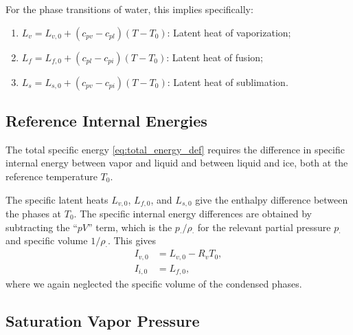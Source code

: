\documentclass{article}
\begin{document}
For the phase transitions of water, this implies specifically:
\begin{enumerate}
    \item $L_v = L_{v,0} + (c_{pv} - c_{pl}) (T - T_0)$: Latent heat of vaporization;
    \item $L_f = L_{f,0} + (c_{pl} - c_{pi}) (T - T_0)$: Latent heat of fusion;
    \item $L_s = L_{s,0} + (c_{pv} - c_{pi}) (T - T_0)$: Latent heat of sublimation.
\end{enumerate}

\subsection{Reference Internal Energies}

The total specific energy \eqref{eq:total_energy_def} requires the difference in specific internal energy between vapor and liquid and between liquid and ice, both at the reference temperature $T_0$. 

The specific latent heats $L_{v,0}$, $L_{f,0}$, and $L_{s,0}$ give the enthalpy difference between the phases at $T_0$. The specific internal energy differences are obtained by subtracting the ``$pV$'' term, which is the $p_\cdot/\rho_\cdot$ for the relevant partial pressure $p_\cdot$ and specific volume $1/\rho_\cdot$. This gives
\begin{align}
     I_{v,0} &= L_{v, 0} - R_v T_0,\\
     I_{i,0} &= L_{f, 0},
\end{align}
where we again neglected the specific volume of the condensed phases. 
   
\subsection{Saturation Vapor Pressure}
\end{document}
